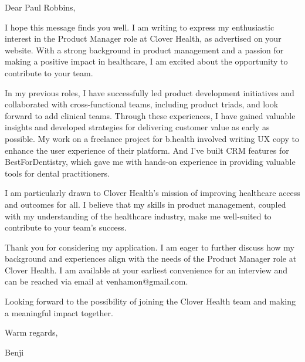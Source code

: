 Dear Paul Robbins,

I hope this message finds you well. I am writing to express my enthusiastic interest in the Product Manager role at Clover Health, as advertised on your website. With a strong background in product management and a passion for making a positive impact in healthcare, I am excited about the opportunity to contribute to your team.

In my previous roles, I have successfully led product development initiatives and collaborated with cross-functional teams, including product triads, and look forward to add clinical teams. Through these experiences, I have gained valuable insights and developed strategies for delivering customer value as early as possible. My work on a freelance project for b.health involved writing UX copy to enhance the user experience of their platform. And I've built CRM features for BestForDentistry, which gave me with hands-on experience in providing valuable tools for dental practitioners.

I am particularly drawn to Clover Health's mission of improving healthcare access and outcomes for all. I believe that my skills in product management, coupled with my understanding of the healthcare industry, make me well-suited to contribute to your team's success.

Thank you for considering my application. I am eager to further discuss how my background and experiences align with the needs of the Product Manager role at Clover Health. I am available at your earliest convenience for an interview and can be reached via email at venhamon@gmail.com.

Looking forward to the possibility of joining the Clover Health team and making a meaningful impact together.

Warm regards,

Benji